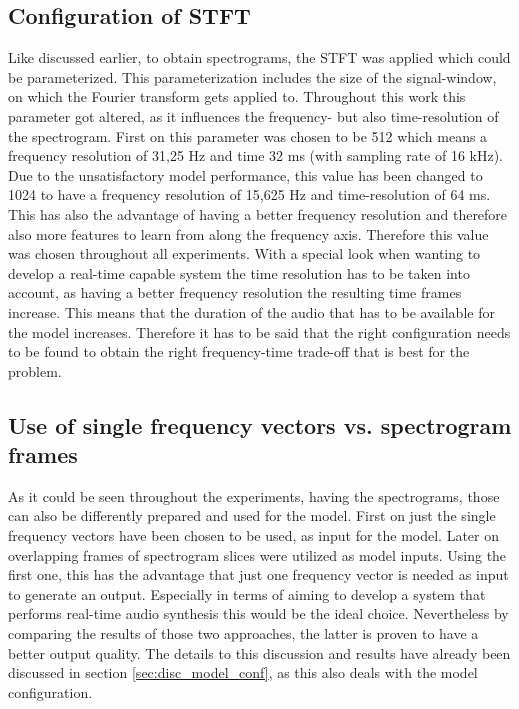 \subsection{Configuration of STFT}
Like discussed earlier, to obtain spectrograms, the STFT was applied which could be parameterized. This parameterization includes the size of the signal-window, on which the Fourier transform gets applied to. Throughout this work this parameter got altered, as it influences the frequency- but also time-resolution of the spectrogram. First on this parameter was chosen to be 512 which means a frequency resolution of 31,25 Hz and time 32 ms (with sampling rate of 16 kHz). Due to the unsatisfactory model performance, this value has been changed to 1024 to have a frequency resolution of 15,625 Hz and time-resolution of 64 ms. This has also the advantage of having a better frequency resolution and therefore also more features to learn from along the frequency axis. Therefore this value was chosen throughout all experiments. With a special look when wanting to develop a real-time capable system the time resolution has to be taken into account, as having a better frequency resolution the resulting time frames increase. This means that the duration of the audio that has to be available for the model increases. Therefore it has to be said that the right configuration needs to be found to obtain the right frequency-time trade-off that is best for the problem.

\subsection{Use of single frequency vectors vs. spectrogram frames}
As it could be seen throughout the experiments, having the spectrograms, those can also be differently prepared and used for the model. First on just the single frequency vectors have been chosen to be used, as input for the model. Later on overlapping frames of spectrogram slices were utilized as model inputs. Using the first one, this has the advantage that just one frequency vector is needed as input to generate an output. Especially in terms of aiming to develop a system that performs real-time audio synthesis this would be the ideal choice. Nevertheless by comparing the results of those two approaches, the latter is proven to have a better output quality. The details to this discussion and results have already been discussed in section \ref{sec:disc_model_conf}, as this also deals with the model configuration. 

